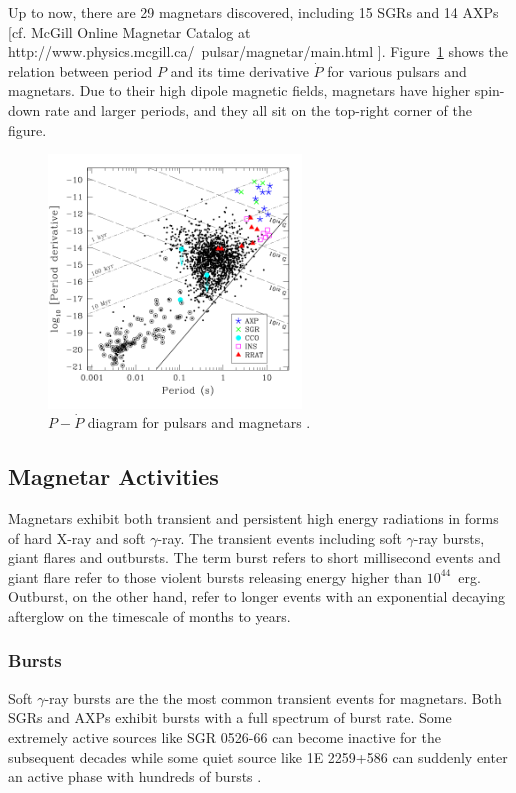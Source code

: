 Up to now, there are 29 magnetars discovered, including 15 SGRs and 14 AXPs [cf. McGill Online Magnetar Catalog at http://www.physics.mcgill.ca/~pulsar/magnetar/main.html \citep{2014ApJS..212....6O}].
Figure~\ref{fig:ppdot} shows the relation between period $P$ and its time derivative $\dot{P}$ for various pulsars and magnetars.
Due to their high dipole magnetic fields, magnetars have higher spin-down rate and larger periods, and they all sit on the top-right corner of the figure.
%
\begin{figure}[h]
  \centering
  \includegraphics[width=0.6\textwidth]{pics/intro/ppdot.png}
  \caption[$P-\dot{P}$ diagram for pulsars and magnetars]{$P-\dot{P}$ diagram for pulsars and magnetars \citep{2010PNAS..107.7147K}.}
  \label{fig:ppdot}
\end{figure}
%
\subsection{Magnetar Activities}
\label{sec:magnetar-activities}

Magnetars exhibit both transient and persistent high energy radiations in forms of hard X-ray and soft $\gamma$-ray.
The transient events including soft $\gamma$-ray bursts, giant flares and outbursts.
The term burst refers to short millisecond events and giant flare refer to those violent bursts releasing energy higher than $10^44$~erg.
Outburst, on the other hand, refer to longer events with an exponential decaying afterglow on the timescale of months to years.

\subsubsection{Bursts}
Soft $\gamma$-ray bursts are the the most common transient events for magnetars. Both SGRs and AXPs exhibit bursts with a full spectrum of burst rate.
Some extremely active sources like SGR 0526-66 can become inactive for the subsequent decades \citep{2003ApJ...585..948K,2009MNRAS.399L..74T} while some quiet source like 1E 2259+586 can suddenly enter an active phase with hundreds of bursts  \citep{2003ApJ...588L..93K}.


